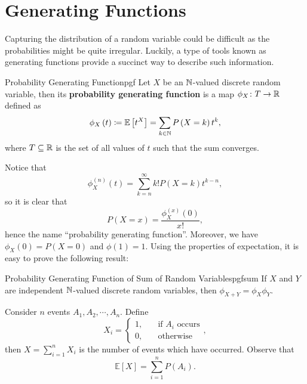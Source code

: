 \documentclass[math]{amznotes}
\theoremstyle{remark}
\newcommand{\0}{\mathbf{0}}
\newcommand{\1}{\mathbf{1}}
\begin{document}
\section{Generating Functions}
Capturing the distribution of a random variable could be difficult as the probabilities might be quite irregular. Luckily, a type of tools known as generating functions provide a succinct way to describe such information.
\begin{dfnbox}{Probability Generating Function}{pgf}
    Let $X$ be an $\mathbb{N}$-valued discrete random variable, then its {\color{red} \textbf{probability generating function}} is a map $\phi_X \colon T \to \mathbb{R}$ defined as 
    \begin{equation*}
        \phi_X\left(t\right) \coloneqq \mathbb{E}\left[t^X\right] = \sum_{k \in \mathbb{N}}P\left(X = k\right)t^k,
    \end{equation*}
    where $T \subseteq \mathbb{R}$ is the set of all values of $t$ such that the sum converges.
\end{dfnbox}
Notice that
\begin{equation*}
    \phi_X^{(n)}\left(t\right) = \sum_{k = n}^{\infty}k!P\left(X = k\right)t^{k - n},
\end{equation*}
so it is clear that 
\begin{equation*}
    P\left(X = x\right) = \frac{\phi_X^{(x)}\left(0\right)}{x!},
\end{equation*}
hence the name ``probability generating function''. Moreover, we have $\phi_X\left(0\right) = P\left(X = 0\right)$ and $\phi\left(1\right) = 1$. Using the properties of expectation, it is easy to prove the following result:
\begin{probox}{\small Probability Generating Function of Sum of Random Variables}{pgfsum}
    If $X$ and $Y$ are independent $\mathbb{N}$-valued discrete random variables, then $\phi_{X + Y} = \phi_X\phi_Y$.
\end{probox}
Consider $n$ events $A_1, A_2, \cdots, A_n$. Define
\begin{equation*}
    X_i = \begin{cases}
        1, & \quad\textrm{if } A_i \textrm{ occurs} \\
        0, & \quad\textrm{otherwise}
    \end{cases},
\end{equation*}
then $X = \sum_{i = 1}^{n}X_i$ is the number of events which have occurred. Observe that 
\begin{equation*}
    \mathbb{E}[X] = \sum_{i = 1}^{n}P(A_i).
\end{equation*}
\end{document}
